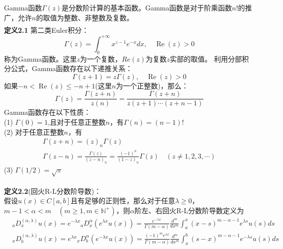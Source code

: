 \documentclass[twoside,UTF8]{nputhesis}
\newcommand{\upcite}[1]{\textsuperscript{\textsuperscript{\cite{#1}}}}
\begin{document}
Gamma函数$\Gamma(z)$是分数阶计算的基本函数。Gamma函数是对于阶乘函数$n!$的推广，允许$n$的取值为整数、非整数及复数。\\
\noindent   %
\textbf{定义2.1}
第二类Euler积分\upcite{Temme1997Special}：
\begin{equation}
\Gamma(z)=\int_{0}^{+\infty} x^{z-1} e^{-x} d x, \quad \operatorname{Re}(z)>0
\end{equation}
称为Gamma函数。这里$z$为一个复数，$Re(z)$为复数$z$实部的取值。
利用分部积分公式，Gamma函数存在以下递推关系：
\begin{equation}
\Gamma(z+1)=z \Gamma(z), \quad \operatorname{Re}(z)>0
\end{equation}
如果$-n<\operatorname{Re}(z) \leq-n+1$(这里$n$为一个正整数)，那么：
\begin{equation}
\Gamma(z)=\frac{\Gamma(z+n)}{z(n)}=\frac{\Gamma(z+n)}{z(z+1) \cdots(z+n-1)}
\end{equation}
Gamma函数存在以下性质：\\
(1) $\Gamma(0)=1$,且对于任意正整数$n$，有$\Gamma(n)=(n-1)!$\\
(2) 对于任意正整数$n$，有
\begin{equation}
\begin{array}{l}{\Gamma(z+n)=(z)_{n} \Gamma(z)} \\ {\Gamma(z-n)=\frac{\Gamma(z)}{(z-n)_{n}}=\frac{(-1)^{n}}{(1-z)_{n}} \Gamma(z)\quad (z \neq 1,2,3, \cdots)}\end{array}
\end{equation}
(3) $\Gamma(1 / 2)=\sqrt{\pi}$

\noindent   %
\textbf{定义2.2}(回火R-L分数阶导数)\upcite{sabzikar2015tempered,于妍妍2016(回火的)分数阶扩散方程的差分数值算法}：
\\
假设$u(x)\in C[a,b]$且有足够的正则性，那么对于任意$\lambda \ge 0$，$m-1<\alpha <m\quad(m\ge 1,m \in \mathbb{N}^{+})$，则$\alpha $阶左、右回火R-L分数阶导数定义为
\begin{equation}
\begin{split}
&{}_{a}D_{x}^{(\alpha ,\lambda )}u(x)={{e}^{-\lambda x}}{}_{a}D_{x}^{\alpha }({{e}^{\lambda x}}u(x))=\frac{{{e}^{-\lambda x}}}{\Gamma (m-\alpha )}\frac{{{d}^{m}}}{d{{x}^{m}}}\int_{a}^{x}{{{(x-s)}^{m-\alpha -1}}{{e}^{\lambda s}}u(s)ds}
\end{split}
\end{equation}
%
\begin{equation}
\begin{split}
&{}_{x}D_{b}^{(\alpha ,\lambda )}u(x)={{e}^{\lambda x}}{}_{x}D_{b}^{\alpha }({{e}^{-\lambda x}}u(x))=\frac{{{(-1)}^{m}}{{e}^{\lambda x}}}{\Gamma (m-\alpha )}\frac{{{d}^{m}}}{d{{x}^{m}}}\int_{x}^{b}{{{(s-x)}^{m-\alpha -1}}{{e}^{-\lambda s}}u(s)ds}
\end{split}
\end{equation}
\end{document}
